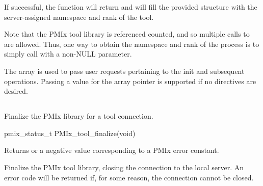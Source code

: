 If successful, the function will return  and will fill the provided structure with the server-assigned namespace and rank of the tool.

Note that the PMIx tool library is referenced counted, and so multiple calls to  are allowed.
Thus, one way to obtain the namespace and rank of the process is to simply call  with a non-NULL parameter.

The  array is used to pass user requests pertaining to the init and subsequent operations.
Passing a  value for the array pointer is supported if no directives are desired.


\subsection{}

\summary

Finalize the \ac{PMIx} library for a tool connection.

\format

\cspecificstart
\begin{codepar}
pmix_status_t PMIx_tool_finalize(void)
\end{codepar}
\cspecificend

Returns  or a negative value corresponding to a PMIx error constant.

\descr

Finalize the PMIx tool library, closing the connection to the local server.
An error code will be returned if, for some reason, the connection cannot be closed.

